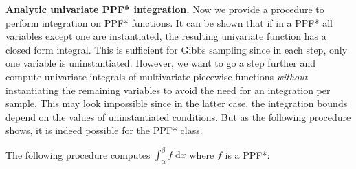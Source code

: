 \documentclass{article} %
\newcommand{\dd}{\;\mathrm{d}} %
\begin{document}
{\bf Analytic univariate PPF* integration.} 
Now we provide a procedure to perform integration on PPF* functions.
It can be shown that if in a PPF* all variables except one are instantiated, 
the resulting univariate function has a closed form integral.  
This is sufficient for Gibbs sampling since in each step, only one variable is uninstantiated.
However, we want to go a step further and compute univariate integrals of multivariate piecewise functions  
\emph{without} instantiating the remaining variables to avoid the need
for an integration per sample.
This may look impossible since in the latter case, the integration bounds depend on the values of uninstantiated conditions. 
But as the following procedure shows, it is indeed possible for the PPF* class.

The following procedure computes $\int_{\alpha}^\beta f \dd x$ where $f$ is a PPF*:
\end{document}
